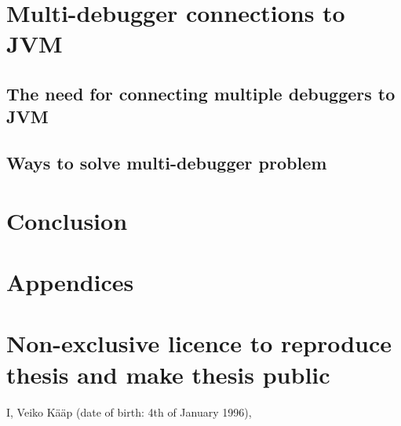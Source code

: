 \documentclass{style/bachelor-thesis}
\begin{document}
\pagebreak

\section{Multi-debugger connections to JVM}
\label{sec:proxy}


\subsection{The need for connecting multiple debuggers to JVM}
\label{sec:need_for_proxy}


\subsection{Ways to solve multi-debugger problem}
\label{sec:proxy_solutions}


\clearpage
\section{Conclusion} 



\newpage

{}


\newpage

\appendix
\section*{Appendices}
\renewcommand{\thesubsection}{\Alph{subsection}}

\pagebreak
\section*{\small Non-exclusive licence to reproduce thesis and make thesis public}


I, Veiko Kääp (date of birth: 4th of January 1996),
\end{document}
